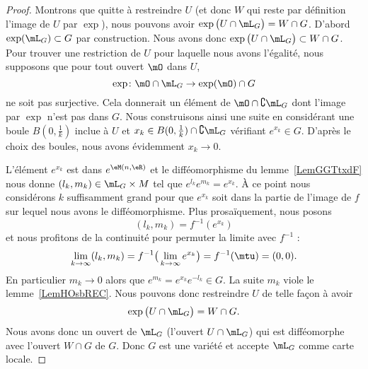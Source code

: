 \begin{proof}
    Montrons que quitte à restreindre \( U\) (et donc \( W\) qui reste par définition l'image de \( U\) par \( \exp\)), nous pouvons avoir \( \exp\big( U\cap\mL_G \big)=W\cap G\). D'abord \( \exp(\mL_G)\subset G\) par construction. Nous avons donc \( \exp\big( U\cap\mL_G \big)\subset W\cap G\). Pour trouver une restriction de \( U\) pour laquelle nous avons l'égalité, nous supposons que pour tout ouvert \( \mO\) dans \( U\),
    \begin{equation}
        \exp\colon \mO\cap\mL_G\to \exp(\mO)\cap G
    \end{equation}
    ne soit pas surjective. Cela donnerait un élément de \( \mO\cap\complement\mL_G\) dont l'image par \( \exp\) n'est pas dans \( G\). Nous construisons ainsi une suite en considérant une boule \( B(0,\frac{1}{ k })\) inclue à \( U\) et \( x_k\in B(0,\frac{1}{ k })\cap\complement\mL_G\) vérifiant \(  e^{x_k}\in G\). D'après le choix des boules, nous avons évidemment \( x_k\to 0\).

    L'élément \(  e^{x_k}\) est dans \(  e^{\eM(n,\eR)}\) et le difféomorphisme du lemme~\ref{LemGGTtxdF} nous donne \( (l_k,m_k)\in \mL_G\times M\) tel que \(  e^{l_k} e^{m_k}= e^{x_k}\). À ce point nous considérons \( k\) suffisamment grand pour que \(  e^{x_k}\) soit dans la partie de l'image de \( f\) sur lequel nous avons le difféomorphisme. Plus prosaïquement, nous posons
    \begin{equation}
        (l_k,m_k)=f^{-1}( e^{x_k})
    \end{equation}
    et nous profitons de la continuité pour permuter la limite avec \( f^{-1}\) :
    \begin{equation}
        \lim_{k\to \infty} (l_k,m_k)=f^{-1}\big( \lim_{k\to \infty}  e^{x_k} \big)=f^{-1}(\mtu)=(0,0).
    \end{equation}
    En particulier \( m_k\to 0\) alors que \(  e^{m_k}= e^{x_k} e^{-l_k}\in G\). La suite \( m_k\) viole le lemme~\ref{LemHOsbREC}. Nous pouvons donc restreindre \( U\) de telle façon à avoir
    \begin{equation}
        \exp\big( U\cap\mL_G \big)=W\cap G.
    \end{equation}
    Nous avons donc un ouvert de \( \mL_G\) (l'ouvert \( U\cap\mL_G\)) qui est difféomorphe avec l'ouvert \( W\cap G\) de \( G\). Donc \( G\) est une variété et accepte \( \mL_G\) comme carte locale.
\end{proof}

